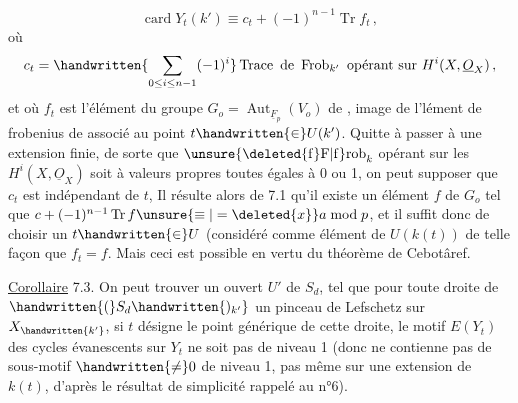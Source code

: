 \[
\operatorname{card}Y_t(k')\equiv c_t+(-1)^{n-1}\operatorname{Tr}f_t\,,
\]
où 
\[
c_t=\handwritten{\sum_{0\leq i\leq n-1}(-1)^i}\operatorname{Trace}\text{ de }\operatorname{Frob}_{k'}\text{ opérant sur }H^i(X,\underline{O}_X)\,,
\]
et où $f_t$ est l'élément du groupe  $G_o=\operatorname{Aut}_{\underline{F}_p}(V_o)$ de \handwritten{$\pi$},  image de l'lément de frobenius de \handwritten{$\pi$} associé au point  $t\handwritten{\in}U(k')$. Quitte à passer à une extension finie,  de sorte que  $\operatorname{\unsure{\deleted{f}F|f}rob}_k$ opérant sur les $H^i(X,\underline{O}_X)$ soit à valeurs propres toutes égales à 0 ou 1, on peut supposer que $c_t$ est indépendant de $t$,  Il résulte alors de 7.1 qu'il existe un élément $f$ de $G_o$ tel que $c+(-1)^{n-1}\operatorname{Tr}f\unsure{\equiv|=\deleted{x}}a\bmod p$, et il suffit donc de choisir un $t\handwritten{\in}U$ (considéré comme élément de $U(k(t))$ de telle façon que $f_t=f$. Mais ceci est possible en vertu du théorème de \rlap{\handwritten{\v{\phantom{C}}}}Cebotâref.

\uline{Corollaire} 7.3.  On peut trouver un ouvert $U'$  de $S_d$, tel que pour toute droite  de $\handwritten{(}S_d\handwritten{)_{k'}}$  un pinceau de Lefschetz sur $X_{\handwritten{k'}}$, si $t$ désigne le point générique de cette droite, le motif $E(Y_t)$ des cycles évanescents sur $Y_t$  ne soit pas de niveau 1 (donc ne contienne pas de sous-motif $\handwritten{\ne}0$ de niveau 1, pas même sur une extension de $k(t)$, d'après le résultat de simplicité rappelé au n°6).

